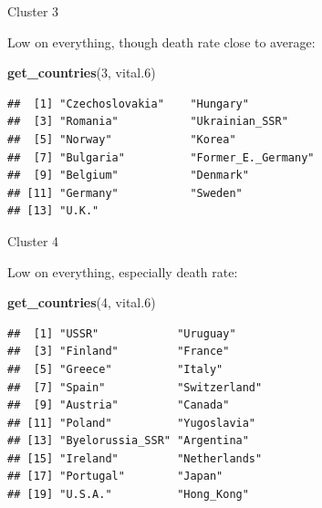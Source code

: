 \documentclass[
  ignorenonframetext,
]{beamer}
\newenvironment{Shaded}{\begin{snugshade}}{\end{snugshade}}
\newcommand{\DecValTok}[1]{\textcolor[rgb]{0.00,0.00,0.81}{#1}}
\newcommand{\FloatTok}[1]{\textcolor[rgb]{0.00,0.00,0.81}{#1}}
\newcommand{\KeywordTok}[1]{\textcolor[rgb]{0.13,0.29,0.53}{\textbf{#1}}}
\newcommand{\NormalTok}[1]{#1}
\begin{document}
\begin{frame}[fragile]{Cluster 3}
\protect\hypertarget{cluster-3-1}{}

Low on everything, though death rate close to average: \footnotesize

\begin{Shaded}
\begin{Highlighting}[]
\KeywordTok{get_countries}\NormalTok{(}\DecValTok{3}\NormalTok{, vital}\FloatTok{.6}\NormalTok{)}
\end{Highlighting}
\end{Shaded}

\begin{verbatim}
##  [1] "Czechoslovakia"    "Hungary"          
##  [3] "Romania"           "Ukrainian_SSR"    
##  [5] "Norway"            "Korea"            
##  [7] "Bulgaria"          "Former_E._Germany"
##  [9] "Belgium"           "Denmark"          
## [11] "Germany"           "Sweden"           
## [13] "U.K."
\end{verbatim}

\normalsize

\end{frame}

\begin{frame}[fragile]{Cluster 4}
\protect\hypertarget{cluster-4}{}

Low on everything, especially death rate: \small

\begin{Shaded}
\begin{Highlighting}[]
\KeywordTok{get_countries}\NormalTok{(}\DecValTok{4}\NormalTok{, vital}\FloatTok{.6}\NormalTok{)}
\end{Highlighting}
\end{Shaded}

\begin{verbatim}
##  [1] "USSR"            "Uruguay"        
##  [3] "Finland"         "France"         
##  [5] "Greece"          "Italy"          
##  [7] "Spain"           "Switzerland"    
##  [9] "Austria"         "Canada"         
## [11] "Poland"          "Yugoslavia"     
## [13] "Byelorussia_SSR" "Argentina"      
## [15] "Ireland"         "Netherlands"    
## [17] "Portugal"        "Japan"          
## [19] "U.S.A."          "Hong_Kong"
\end{verbatim}

\normalsize

\end{frame}
\end{document}

